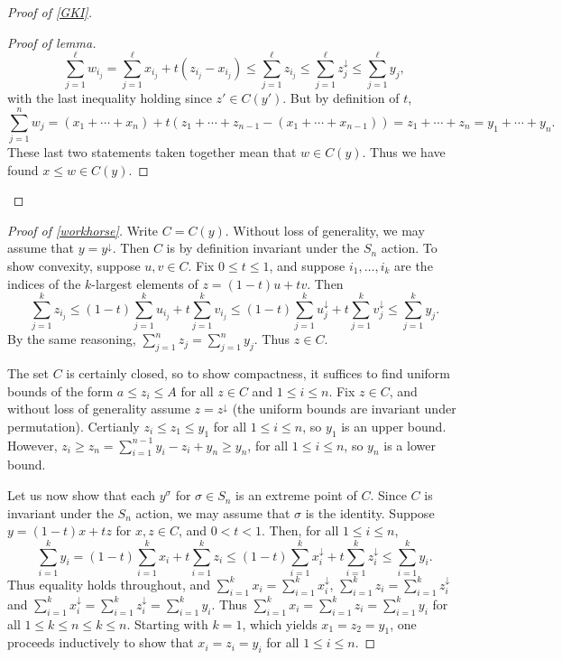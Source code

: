 \documentclass[12pt]{amsart}
\begin{document}
\begin{proof}[Proof of \cref{GKI}]
\begin{proof}[Proof of lemma]
\[\sum_{j=1}^\ell w_{i_j} = \sum_{j=1}^{\ell} x_{i_j} + t(z_{i_j}-x_{i_j}) \leq \sum_{j=1}^{\ell} z_{i_j} \leq \sum_{j=1}^{\ell} z_j^\downarrow \leq \sum_{j=1}^\ell y_j,\]
with the last inequality holding since $z' \in C(y')$. But by definition of $t$,
\[\sum_{j=1}^n w_j = (x_1 + \cdots + x_n) + t(z_1 + \cdots + z_{n-1} - (x_1 + \cdots + x_{n-1})) = z_1 + \cdots + z_n = y_1 + \cdots + y_n.\]
These last two statements taken together mean that $w \in C(y)$. Thus we have found $x \leq w \in C(y)$.\end{proof}
\end{proof}



\begin{proof}[Proof of \cref{workhorse}]
Write $C = C(y)$. Without loss of generality, we may assume that $y = y^\downarrow$. Then $C$ is by definition invariant under the $S_n$ action.
To show convexity, suppose $u,v \in C$. Fix $0 \leq t \leq 1$, and suppose $i_1,\ldots,i_k$ are the indices of the $k$-largest elements of $z = (1-t)u+tv$. Then
\[\sum_{j=1}^k z_{i_j} \leq (1-t)\sum_{j=1}^k u_{i_j} + t\sum_{j=1}^k v_{i_j} \leq (1-t)\sum_{j=1}^k u_j^\downarrow + t\sum_{j=1}^k v_j^\downarrow \leq \sum_{j=1}^k y_j.\] By the same reasoning, $\sum_{j=1}^n z_j = \sum_{j=1}^n y_j$. Thus $z \in C$.

The set $C$ is certainly closed, so to show compactness, it suffices to find uniform bounds of the form $a \leq z_i \leq A$ for all $z \in C$ and $1 \leq i \leq n$. Fix $z \in C$, and without loss of generality assume $z = z^\downarrow$ (the uniform bounds are invariant under permutation). Certianly $z_i \leq z_1 \leq y_1$ for all $1 \leq i \leq n$, so $y_1$ is an upper bound. However, $z_i \geq z_n = \sum_{i=1}^{n-1} y_i-z_i + y_n \geq y_n$, for all $1 \leq i \leq n$, so $y_n$ is a lower bound.

Let us now show that each $y^\sigma$ for $\sigma \in S_n$ is an extreme point of $C$. Since $C$ is invariant under the $S_n$ action, we may assume that $\sigma$ is the identity. Suppose $y = (1-t)x + tz$ for $x,z\in C$, and $0 < t < 1$. Then, for all $1 \leq i \leq n$,
\[\sum_{i=1}^k y_i = (1-t)\sum_{i=1}^k x_i + t\sum_{i=1}^k z_i \leq (1-t)\sum_{i=1}^k x_i^\downarrow + t\sum_{i=1}^k z_i^\downarrow \leq \sum_{i=1}^k y_i.\]
Thus equality holds throughout, and $\sum_{i=1}^k x_i =  \sum_{i=1}^k x_i^\downarrow$, $\sum_{i=1}^k z_i =  \sum_{i=1}^k z_i^\downarrow$ and $\sum_{i=1}^k x_i^\downarrow = \sum_{i=1}^k z_i^\downarrow = \sum_{i=1}^k y_i$. Thus $\sum_{i=1}^k x_i = \sum_{i=1}^k z_i = \sum_{i=1}^k y_i$ for all $1 \leq k \leq n \leq k \leq n$. Starting with $k=1$, which yields $x_1 = z_2 = y_1$, one proceeds inductively to show that $x_i = z_i = y_i$ for all $1 \leq i \leq n$.


\end{proof}
\end{document}
